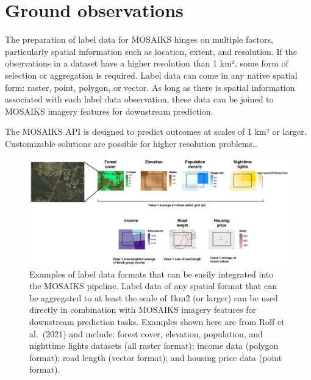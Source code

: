 \documentclass[
  letterpaper,
  DIV=11,
  numbers=noendperiod]{scrreprt}
\begin{document}
\hypertarget{ground-observations}{%
\section*{Ground observations}\label{ground-observations}}


The preparation of label data for MOSAIKS hinges on multiple factors,
particularly spatial information such as location, extent, and
resolution. If the observations in a dataset have a higher resolution
than 1 km², some form of selection or aggregation is required. Label
data can come in any native spatial form: raster, point, polygon, or
vector. As long as there is spatial information associated with each
label data observation, these data can be joined to MOSAIKS imagery
features for downstream prediction.

\begin{tcolorbox}[enhanced jigsaw, opacityback=0, left=2mm, leftrule=.75mm, colback=white, opacitybacktitle=0.6, colbacktitle=quarto-callout-note-color!10!white, toprule=.15mm, arc=.35mm, toptitle=1mm, colframe=quarto-callout-note-color-frame, bottomrule=.15mm, coltitle=black, bottomtitle=1mm, rightrule=.15mm, titlerule=0mm, title=\textcolor{quarto-callout-note-color}{\faInfo}\hspace{0.5em}{Note}, breakable]

The MOSAIKS API is designed to predict outcomes at scales of 1 km² or
larger. Customizable solutions are possible for higher resolution
problems..

\end{tcolorbox}

\begin{figure}

{\centering \includegraphics{images/rolf_et_al_2021-Fig_S4.png}

}

\caption{\label{fig-label-agg}Examples of label data formats that can be
easily integrated into the MOSAIKS pipeline. Label data of any spatial
format that can be aggregated to at least the scale of 1km2 (or larger)
can be used directly in combination with MOSAIKS imagery features for
downstream prediction tasks. Examples shown here are from Rolf et
al.~(2021) and include: forest cover, elevation, population, and
nighttime lights datasets (all raster format); income data (polygon
format); road length (vector format); and housing price data (point
format).}

\end{figure}
\end{document}
